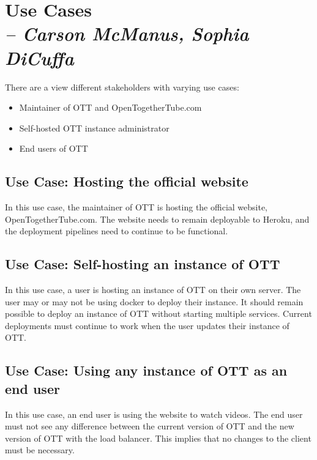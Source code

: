 \chapter{Use Cases \\
  \small{\textit{-- Carson McManus, Sophia DiCuffa}}
  \label{Chapter::UseCases}}

There are a view different stakeholders with varying use cases:

\begin{itemize}
	\item Maintainer of OTT and OpenTogetherTube.com
	\item Self-hosted OTT instance administrator
	\item End users of OTT
\end{itemize}

\section{Use Case: Hosting the official website}

In this use case, the maintainer of OTT is hosting the official website, OpenTogetherTube.com. The website needs to remain deployable to Heroku, and the deployment pipelines need to continue to be functional.

\section{Use Case: Self-hosting an instance of OTT}

In this use case, a user is hosting an instance of OTT on their own server. The user may or may not be using docker to deploy their instance. It should remain possible to deploy an instance of OTT without starting multiple services. Current deployments must continue to work when the user updates their instance of OTT.

\section{Use Case: Using any instance of OTT as an end user}

In this use case, an end user is using the website to watch videos. The end user must not see any difference between the current version of OTT and the new version of OTT with the load balancer. This implies that no changes to the client must be necessary.
